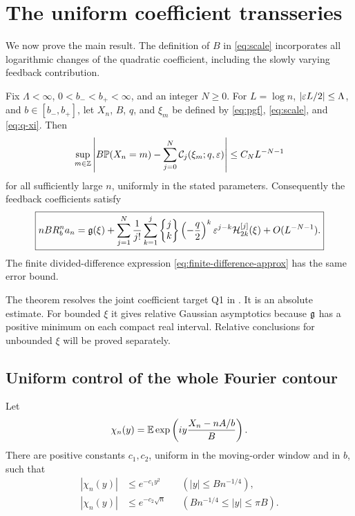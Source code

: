 \section{The uniform coefficient transseries}
\label{sec:main-proof}

We now prove the main result. The definition of $B$ in
\eqref{eq:scale} incorporates all logarithmic changes of the quadratic
coefficient, including the slowly varying feedback contribution.

\begin{theorem}
\label{thm:all-orders}
Fix $\Lambda<\infty$, $0<b_-<b_+<\infty$, and an integer $N\ge0$.
For $L=\log n$, $|\varepsilon L/2|\le\Lambda$, and $b\in[b_-,b_+]$,
let $X_n$, $B$, $q$, and $\xi_m$ be defined by
\eqref{eq:pgf}, \eqref{eq:scale}, and \eqref{eq:q-xi}. Then
\begin{equation}\label{eq:uniform-lattice}
 \sup_{m\in\mathbb Z}\left|
 B\mathbb P(X_n=m)-\sum_{j=0}^N\mathcal C_j(\xi_m;q,\varepsilon)
 \right|\le C_N L^{-N-1}
\end{equation}
for all sufficiently large $n$, uniformly in the stated parameters.
Consequently the feedback coefficients satisfy
\begin{equation}\label{eq:all-orders-coefficient}
 \boxed{\displaystyle
 nB R_b^n a_n
 =\mathfrak g(\xi)+
  \sum_{j=1}^N\frac1{j!}\sum_{k=1}^j
    \left\{\begin{matrix}j\\k\end{matrix}\right\}\left(-\frac q2\right)^k\varepsilon^{j-k}
           \mathcal H_{2k}^{[j]}(\xi)
       +O(L^{-N-1}).}
\end{equation}
The finite divided-difference expression
\eqref{eq:finite-difference-approx} has the same error bound.
\end{theorem}

The theorem resolves the joint coefficient target Q1 in
\cite{repo-boundary}. It is an absolute estimate. For bounded $\xi$
it gives relative Gaussian asymptotics because $\mathfrak g$ has a
positive minimum on each compact real interval. Relative conclusions
for unbounded $\xi$ will be proved separately.

\subsection{Uniform control of the whole Fourier contour}

\begin{lemma}
\label{lem:fourier-tail}
Let
\begin{equation}\label{eq:chi}
 \chi_n(y)=\mathbb E\exp\left(iy\frac{X_n-nA/b}{B}\right).
\end{equation}
There are positive constants $c_1,c_2$, uniform in the moving-order
window and in $b$, such that
\begin{align}
 |\chi_n(y)|&\le e^{-c_1y^2}
       &&(|y|\le Bn^{-1/4}),\label{eq:fourier-small}\\
 |\chi_n(y)|&\le e^{-c_2\sqrt n}
       &&(Bn^{-1/4}\le |y|\le\pi B).
       \label{eq:fourier-large}
\end{align}
\end{lemma}

